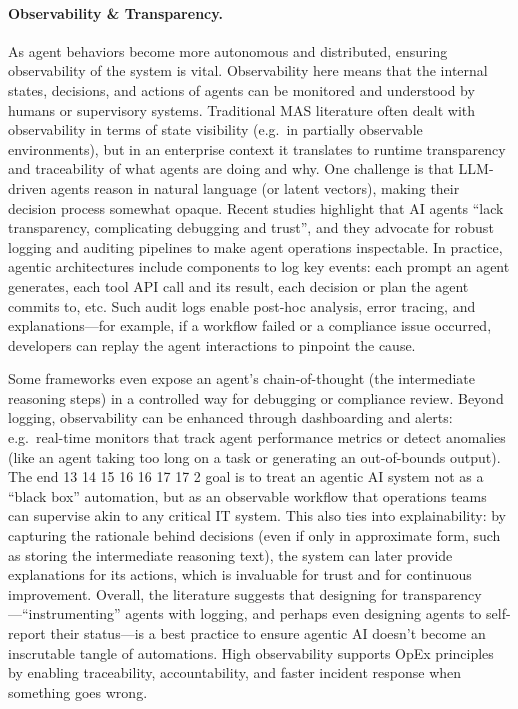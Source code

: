 \paragraph{Observability \& Transparency.} As agent behaviors become more autonomous and distributed, ensuring observability of the system is vital. Observability here means that the internal states, decisions, and actions of agents can be monitored and understood by humans or supervisory systems. Traditional MAS literature often dealt with observability in terms of state visibility (e.g.~in partially observable environments), but in an enterprise context it translates to runtime transparency and traceability of what agents are doing and why. One challenge is that LLM-driven agents reason in natural language (or latent vectors), making their decision process somewhat opaque. Recent studies highlight that AI agents “lack transparency, complicating debugging and trust”, and they advocate for robust logging and auditing pipelines to make agent operations inspectable. In practice, agentic architectures include components to log key events: each prompt an agent generates, each tool API call and its result, each decision or plan the agent commits to, etc. Such audit logs enable post-hoc analysis, error tracing, and explanations---for example, if a workflow failed or a compliance issue occurred, developers can replay the agent interactions to pinpoint the cause. 

Some frameworks even expose an agent's chain-of-thought (the intermediate reasoning steps) in a controlled way for debugging or compliance review. Beyond logging, observability can be enhanced through dashboarding and alerts: e.g.~real-time monitors that track agent performance metrics or detect anomalies (like an agent taking too long on a task or generating an out-of-bounds output). The end 13 14 15 16 16 17 17 2 goal is to treat an agentic AI system not as a “black box” automation, but as an observable workflow that operations teams can supervise akin to any critical IT system. This also ties into explainability: by capturing the rationale behind decisions (even if only in approximate form, such as storing the intermediate reasoning text), the system can later provide explanations for its actions, which is invaluable for trust and for continuous improvement. Overall, the literature suggests that designing for transparency---“instrumenting” agents with logging, and perhaps even designing agents to self-report
their status---is a best practice to ensure agentic AI doesn't become an inscrutable tangle of
automations. High observability supports OpEx principles by enabling traceability, accountability, and faster incident response when something goes wrong.

